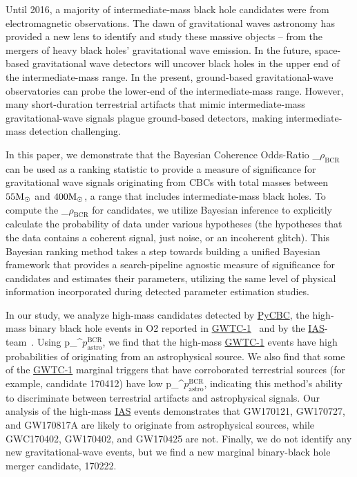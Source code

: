 \documentclass[%
 nofootinbib,
 amsmath,amssymb,
 aps,
 twocolumn,
 superscriptaddress
]{revtex4-2}
\newcommand{\pycbc}{{\sc \href{https://pycbc.org/}{{PyCBC}}}\xspace}
\newcommand{\GWTC}{{\sc \href{https://ui.adsabs.harvard.edu/abs/2019PhRvX...9c1040A/abstract}{{GWTC-1}}}\xspace}
\newcommand{\IAS}{{\sc \href{https://ui.adsabs.harvard.edu/abs/2020PhRvD.101h3030V/abstract}{{IAS}}}\xspace}
\newcommand{\fancytext}[1]{{\relax\ifmmode#1\else $#1$\fi}\xspace}
\newcommand{\mathcmd}[1]{{\sc \relax\ifmmode#1\else $#1$\fi}\xspace}
\newcommand{\bcr}{\mathcmd{\rho_\text{BCR}}}
\newcommand{\msun}{\mathcmd{\text{M}_\odot}}
\newcommand{\pastrobcr}{\fancytext{p_\text{astro}^{\text{BCR}}}}
\begin{document}
Until 2016, a majority of intermediate-mass black hole candidates were from electromagnetic observations. The dawn of gravitational waves astronomy has provided a new lens to identify and study these massive objects -- from the mergers of heavy black holes' gravitational wave emission. In the future, space-based gravitational wave detectors will uncover black holes in the upper end of the intermediate-mass range. In the present, ground-based gravitational-wave observatories can probe the lower-end of the intermediate-mass range. However, many short-duration terrestrial artifacts that mimic intermediate-mass gravitational-wave signals plague ground-based detectors, making intermediate-mass detection challenging. 

In this paper, we demonstrate that the Bayesian Coherence Odds-Ratio \bcr~\cite{BCR1} can be used as a ranking statistic to provide a measure of significance for gravitational wave signals originating from CBCs with total masses between $55\msun$ and $400\msun$, a range that includes intermediate-mass black holes. To compute the \bcr for candidates, we utilize Bayesian inference to explicitly calculate the probability of data under various hypotheses (the hypotheses that the data contains a coherent signal, just noise, or an incoherent glitch). This Bayesian ranking method takes a step towards building a unified Bayesian framework that provides a search-pipeline agnostic measure of significance for candidates and estimates their parameters, utilizing the same level of physical information incorporated during detected parameter estimation studies. 

In our study, we analyze high-mass candidates detected by \pycbc, the high-mass binary black hole events in O2 reported in \GWTC~\cite{GWTC1} and by the \IAS-team~\cite{IAS1, IAS2}. Using \pastrobcr, we find that the high-mass \GWTC events have high probabilities of originating from an astrophysical source. We also find that some of the \GWTC marginal triggers that have corroborated terrestrial sources (for example, candidate 170412) have low \pastrobcr, indicating this method's ability to discriminate between terrestrial artifacts and astrophysical signals. Our analysis of the high-mass \IAS events demonstrates that GW170121, GW170727, and GW170817A are likely to originate from astrophysical sources, while GWC170402, GW170402, and GW170425  are not. Finally, we do not identify any new gravitational-wave events, but we find a new marginal binary-black hole merger candidate, 170222. 
\end{document}
